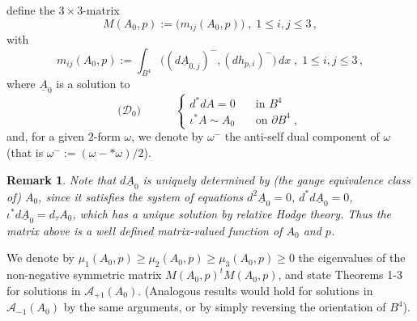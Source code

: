 \documentclass[11pt]{article}
\numberwithin{equation}{section} \setlength{\topmargin}{-35pt}
\begin{document}
define the $3\times 3$-matrix
$$M(A_0,p):=\bigl(m_{ij}(A_0,p)\bigr)\;,\; 1\le i,j\le 3\,,$$
with
$$m_{ij}(A_0,p):=\int_{B^4}\bigl((d\underline{A}_{0,j})^-,(dh_{p,i})^-\bigr) \,dx\;,\; 1\le i,j\le 3\,,$$
where $\underline{A}_0$ is a solution to
$$\bigl(\mathcal{D}_0\bigr)\qquad\quad\left\{\begin{array}{ll}
d^{\ast}dA=0\quad&\mbox{in } B^4\\
\iota^{\ast}A\sim A_0\quad&\mbox{on } \partial B^4\;,
\end{array}\right.$$
and, for a given $2$-form $\omega$, we denote by $\omega^-$ the
anti-self dual component of $\omega$ (that is
$\omega^-:=(\omega-\ast\omega)/2$).
\newtheorem{remark}{Remark}[section]
\begin{remark}
\label{R2.1} Note that $d\underline{A}_0$ is uniquely determined by
(the gauge equivalence class of) $A_0$, since it satisfies the
system of equations $d^2\underline{A}_0=0$,
$d^{\ast}d\underline{A}_0=0$, $\iota^{\ast}d\underline{A}_0=d_\tau
A_0$, which has a unique solution by relative Hodge theory. Thus the
matrix above is a well defined matrix-valued function of $A_0$ and
$p$.
\end{remark}
We denote by $\mu_1(A_0,p)\ge\mu_2(A_0,p)\ge\mu_3(A_0,p)\ge 0$ the
eigenvalues of the non-negative symmetric matrix $M(A_0,p)^t
M(A_0,p)$, and state Theorems 1-3 for solutions in
$\mathcal{A}_{+1}(A_0)$. (Analogous results would hold for solutions
in $\mathcal{A}_{-1}(A_0)$ by the same arguments, or by simply
reversing the orientation of $B^4$).
\end{document}
